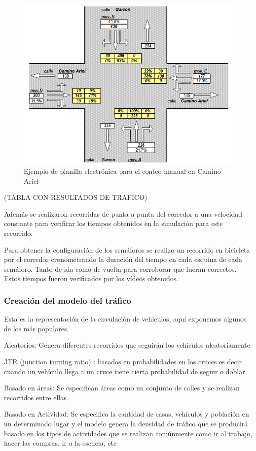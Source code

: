 \begin{figure}[H]
	\centering
	\includegraphics[width=0.7\linewidth]{Figures/conteo_hoja}
	\caption{Ejemplo de planilla electrónica para el conteo manual en Camino Ariel}
	\label{fig:conteo_hoja}
\end{figure}

(TABLA CON RESULTADOS DE TRAFICO)

Además se realizaron recorridas de punta a punta del corredor a una velocidad constante para verificar los tiempos obtenidos en la simulación para este recorrido.

Para obtener la configuración de los semáforos se realizo un recorrido en bicicleta por el corredor cronometrando la duración del tiempo en cada esquina de cada semáforo. Tanto de ida como de vuelta para corroborar que fueran correctos. Estos tiempos fueron verificados por los vídeos obtenidos.


\newpage
\subsubsection{Creación del modelo del tráfico}
Esta es la representación de la circulación de vehículos, aquí exponemos algunos de los más populares. 

Aleatorios: Genera diferentes recorridos que seguirán los vehículos aleatoriamente

JTR (junction turning ratio) : basados en probabilidades en los cruces  es decir cuando un vehículo llega a un cruce tiene cierta probabilidad de seguir o doblar.

Basado en áreas:  Se especifican áreas como un conjunto de calles y se realizan recorridos entre ellas.


Basado en Actividad: Se especifica la cantidad de casas, vehículos y población en un determinado lugar y el modelo genera la densidad de tráfico que se producirá basado en los tipos de actividades que se realizan comúnmente como ir al trabajo, hacer las compras, ir a la escuela,  etc

